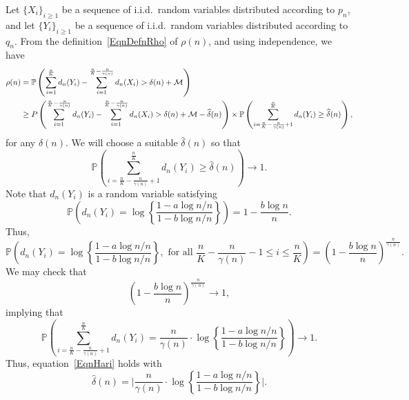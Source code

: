 Let $\{X_i\}_{i \geq 1}$ be a sequence of i.i.d.\ random variables distributed according to $p_n$, and let $\{Y_i\}_{i \geq 1}$ be a sequence of i.i.d.\ random variables distributed according to $q_n$. From the definition~\eqref{EqnDefnRho} of $\rho(n)$, and using independence, we have
\begin{align}
\rho(n) &= \mathbb P \left( \sum_{i=1}^{\frac{n}{K}} d_n(Y_i) - \sum_{i=1}^{\frac{n}{K}-\frac{n}{\gamma(n)}} d_n(X_i) > \delta(n) + \cM \right) \notag \\
%
&\geq P \left( \sum_{i=1}^{\frac{n}{K}-\frac{n}{\gamma(n)}} d_n(Y_i) - \sum_{i=1}^{\frac{n}{K}-\frac{n}{\gamma(n)}} d_n(X_i) > \delta(n) + \cM - \hat \delta(n) \right)\times \mathbb P\left( \sum_{i= \frac{n}{K}-\frac{n}{\gamma(n)}+1}^{\frac{n}{K}} d_n(Y_i) \geq \hat \delta(n)\right), \label{eq: product}
\end{align}
for any $\hat \delta(n)$. We will choose a suitable $\hat \delta(n)$ so that
\begin{equation}
\label{EqnHari}
\mathbb P\left( \sum_{i= \frac{n}{K}-\frac{n}{\gamma(n)}+1}^{\frac{n}{K}} d_n(Y_i) \geq \hat \delta(n)\right) \longrightarrow 1.
\end{equation}
Note that $d_n(Y_i)$ is a random variable satisfying 
\begin{equation*}
\mathbb P \left( d_n(Y_i) = \log \left\{\frac{1-a\log n/n}{1 - b\log n/n}\right\}\right) = 1 - \frac{b\log n}{n}.
\end{equation*}
Thus, 
\begin{equation*}
\mathbb P \left(d_n(Y_i) = \log \left\{\frac{1-a\log n/n}{1 - b\log n/n}\right\}, \text{ for all } \frac{n}{K}-\frac{n}{\gamma(n)}-1 \leq i \leq \frac{n}{K} \right) = \left(1 - \frac{b\log n}{n}\right)^{\frac{n}{\gamma(n)}}.
\end{equation*}
We may check that
\begin{equation*}
\left(1 - \frac{b\log n}{n}\right)^{\frac{n}{\gamma(n)}} \longrightarrow 1, 
\end{equation*}
implying that
\begin{equation*}
\mathbb P \left(\sum_{i= \frac{n}{K}-\frac{n}{\gamma(n)}+1}^{\frac{n}{K}} d_n(Y_i) = \frac{n}{\gamma(n)} \cdot \log \left\{\frac{1-a\log n/n}{1-b\log n/n}\right\} \right) \longrightarrow 1.
\end{equation*}
Thus, equation~\eqref{EqnHari} holds with 
\begin{equation}
\hat\delta(n) = \Bigg|  \frac{n}{\gamma(n)} \cdot \log \left\{\frac{1-a\log n/n}{1-b\log n/n}\right\} \Bigg|.
\end{equation}
